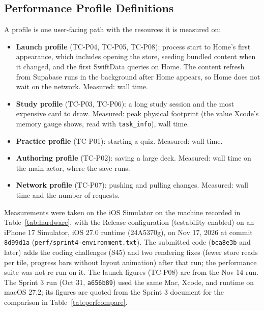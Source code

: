 \documentclass[12pt,letterpaper]{article}
\begin{document}
\subsection{Performance Profile Definitions}
A profile is one user-facing path with the resources it is measured on:
\begin{itemize}
  \item \textbf{Launch profile} (TC-P04, TC-P05, TC-P08): process start to Home's first
        appearance, which includes opening the store, seeding bundled content when it
        changed, and the first SwiftData queries on Home. The content refresh from
        Supabase runs in the background after Home appears, so Home does not wait on
        the network. Measured: wall time.
  \item \textbf{Study profile} (TC-P03, TC-P06): a long study session and the most
        expensive card to draw. Measured: peak physical footprint (the value Xcode's
        memory gauge shows, read with \texttt{task\_info}), wall time.
  \item \textbf{Practice profile} (TC-P01): starting a quiz. Measured: wall time.
  \item \textbf{Authoring profile} (TC-P02): saving a large deck. Measured: wall time
        on the main actor, where the save runs.
  \item \textbf{Network profile} (TC-P07): pushing
        and pulling changes. Measured: wall time and the number of requests.
\end{itemize}
Measurements were taken on the iOS Simulator on the machine recorded in
Table~\ref{tab:hardware}, with the Release configuration (testability enabled) on an
iPhone 17 Simulator, iOS 27.0 runtime (24A5370g), on Nov 17, 2026 at commit
\texttt{8d99d1a} (\texttt{perf/sprint4-environment.txt}). The submitted code
(\texttt{bca8e3b} and later) adds the coding challenges (S45) and two rendering fixes (fewer
store reads per tile, progress bars without layout animation) after that run; the
performance suite was not re-run on it. The
launch figures (TC-P08) are from the Nov 14 run. The Sprint 3 run (Oct 31,
\texttt{a656b89}) used the same Mac, Xcode, and runtime on macOS 27.2; its figures are
quoted from the Sprint 3 document for the comparison in Table~\ref{tab:perfcompare}.
\end{document}

